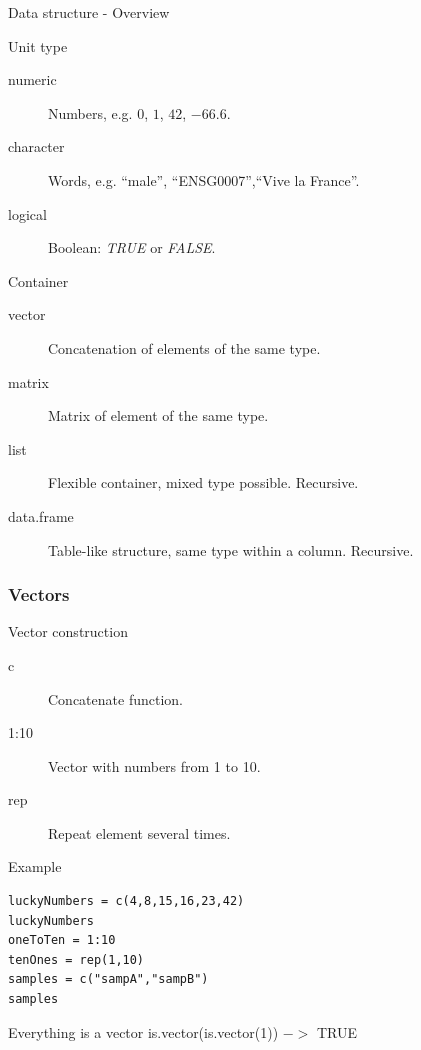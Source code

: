 \documentclass[10pt]{beamer}
\newenvironment{xframe}[2][]
  {\begin{frame}[fragile,environment=xframe,#1]
  \frametitle{#2}}
  {\end{frame}}
\begin{document}
\begin{frame}{Data structure - Overview}
  \begin{block}{Unit type}
    \begin{description}
      \item[numeric] Numbers, e.g. $0$, $1$, $42$, $-66.6$.
      \item[character] Words, e.g. ``male'', ``ENSG0007'',``Vive la France''.
      \item[logical] Boolean: {\it TRUE} or {\it FALSE}.
    \end{description}
  \end{block}
  \begin{block}{Container}
    \begin{description}
    \item[vector] Concatenation of elements of the same type.
    \item[matrix] Matrix of element of the same type.
    \item[list] Flexible container, mixed type possible. Recursive.
    \item[data.frame] Table-like structure, same type within a column.  Recursive.
    \end{description}
  \end{block}
\end{frame}


\begin{xframe}{Vectors}
  \begin{block}{Vector construction}
    \begin{description}
    \item[c] Concatenate function.
    \item[1:10] Vector with numbers from 1 to 10.
    \item[rep] Repeat element several times.
    \end{description}
  \end{block}
  \begin{exampleblock}{Example}
\begin{verbatim}
luckyNumbers = c(4,8,15,16,23,42) 
luckyNumbers
oneToTen = 1:10
tenOnes = rep(1,10)
samples = c("sampA","sampB")
samples
\end{verbatim}
  \end{exampleblock}
  \begin{alertblock}{Everything is a vector}
    is.vector(is.vector(1)) $->$ TRUE
  \end{alertblock}
\end{xframe}
\end{document}
